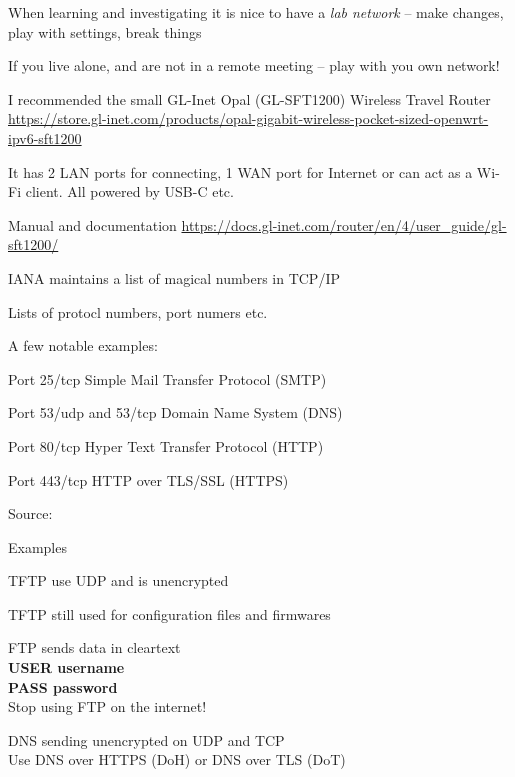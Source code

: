 \documentclass[Screen16to9,17pt]{foils}
\begin{document}
\begin{list2}
\item When learning and investigating it is nice to have a \emph{lab network} -- make changes, play with settings, break things
\item If you live alone, and are not in a remote meeting -- play with you own network!
\item I recommended the small GL-Inet Opal (GL-SFT1200) Wireless Travel Router\\
\url{https://store.gl-inet.com/products/opal-gigabit-wireless-pocket-sized-openwrt-ipv6-sft1200}
\item It has 2 LAN ports for connecting, 1 WAN port for Internet or can act as a Wi-Fi client. All powered by USB-C etc.
\item Manual and documentation \url{https://docs.gl-inet.com/router/en/4/user_guide/gl-sft1200/}
\end{list2}





\begin{list1}
\item IANA maintains a list of magical numbers in TCP/IP
\item Lists of protocl numbers, port numers etc.
\item A few notable examples:
\begin{list2}
\item Port 25/tcp Simple Mail Transfer Protocol (SMTP)
\item Port 53/udp and 53/tcp Domain Name System (DNS)
\item Port 80/tcp Hyper Text Transfer Protocol (HTTP)
\item Port 443/tcp HTTP over TLS/SSL (HTTPS)
\end{list2}
\item Source: 
\end{list1}




Examples
\begin{list2}
\item TFTP use UDP and is unencrypted
\item TFTP still used for configuration files and firmwares
\item FTP sends data in cleartext\\
{\bfseries USER username}\\
{\bfseries PASS password}\\
Stop using FTP on the internet!
\item DNS sending unencrypted on UDP and TCP\\
Use DNS over HTTPS (DoH) or DNS over TLS (DoT)
\end{list2}
\end{document}
